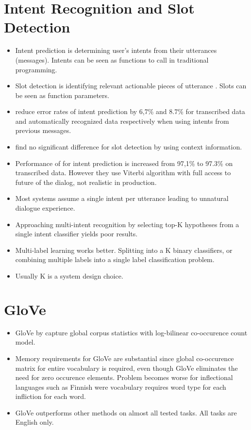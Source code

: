 \documentclass[12pt,a4paper,english
]{tutthesis}
\begin{document}
\section{Intent Recognition and Slot Detection}
\label{se:intetn_prediction_and_slot_detection}
\begin{itemize}
\item Intent prediction is determining user's intents from their utterances (messages). Intents can be seen as functions to call in traditional programming.
\item Slot detection is identifying relevant actionable pieces of utterance \cite{Bhargava2013}. Slots can be seen as function parameters.
\item \cite{Bhargava2013} reduce error rates of intent prediction by 6,7\% and 8.7\% for transcribed data and automatically recognized data respectively when using intents from previous messages.
\item \cite{Bhargava2013} find no significant difference for slot detection by using context information.
\item Performance of \cite{Bhargava2013} for intent prediction is increased from 97,1\% to 97.3\% on transcribed data. However they use Viterbi algorithm with full access to future of the dialog, not realistic in production.
\item Most systems assume a single intent per utterance leading to unnatural dialogue experience. \cite{Xu2013}
\item Approaching multi-intent recognition by selecting top-K hypotheses from a single intent classifier yields poor results. \cite{Xu2013}
\item Multi-label learning works better. Splitting into a K binary classifiers, or combining multiple labels into a single label classification problem. \cite{Xu2013}
\item Usually K is a system design choice. \cite{Xu2013}
\end{itemize}

\section{GloVe}
\begin{itemize}
\item GloVe by \cite{Pennington2014} capture global corpus statistics with log-bilinear co-occurence count model.
\item Memory requirements for GloVe are substantial since global co-occurence matrix for entire vocabulary is required, even though GloVe eliminates the need for zero occurence elements. Problem becomes worse for inflectional languages such as Finnish were vocabulary requires word type for each infliction for each word.
\item GloVe outperforms other methods on almost all tested tasks. All tasks are English only. \cite{Pennington2014}
\end{itemize}
\end{document}
